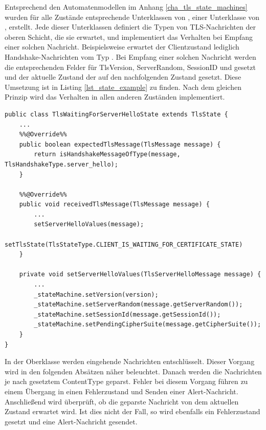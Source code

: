 Entsprechend den Automatenmodellen im Anhang \ref{cha_tls_state_machines} wurden für alle Zustände entsprechende Unterklassen von , einer Unterklasse von , erstellt. Jede dieser Unterklassen definiert die Typen von TLS-Nachrichten der oberen Schicht, die sie erwartet, und implementiert das Verhalten bei Empfang einer solchen Nachricht. Beispielsweise erwartet der Clientzustand  lediglich Handshake-Nachrichten vom Typ \serverhello{}. Bei Empfang einer solchen Nachricht werden die entsprechenden Felder für TlsVersion, ServerRandom, SessionID und \ciphersuite{} gesetzt und der aktuelle Zustand der  auf den nachfolgenden Zustand gesetzt. Diese Umsetzung ist in Listing \ref{lst_state_example} zu finden. Nach dem gleichen Prinzip wird das Verhalten in allen anderen Zuständen implementiert. 

\begin{lstlisting}
public class TlsWaitingForServerHelloState extends TlsState {
	...
	%%@Override%%
	public boolean expectedTlsMessage(TlsMessage message) {
		return isHandshakeMessageOfType(message, TlsHandshakeType.server_hello);
	}

	%%@Override%%
	public void receivedTlsMessage(TlsMessage message) {
		...
		setServerHelloValues(message);
		setTlsState(TlsStateType.CLIENT_IS_WAITING_FOR_CERTIFICATE_STATE)
	}

	private void setServerHelloValues(TlsServerHelloMessage message) {
		...
		_stateMachine.setVersion(version);
		_stateMachine.setServerRandom(message.getServerRandom());
		_stateMachine.setSessionId(message.getSessionId());
		_stateMachine.setPendingCipherSuite(message.getCipherSuite());
	}
}
\end{lstlisting}

In der Oberklasse  werden eingehende Nachrichten entschlüsselt. Dieser Vorgang wird in den folgenden Absätzen näher beleuchtet. Danach werden die Nachrichten je nach gesetztem ContentType geparst. Fehler bei diesem Vorgang führen zu einem Übergang in einen Fehlerzustand und Senden einer Alert-Nachricht. Anschließend wird überprüft, ob die geparste Nachricht von dem aktuellen Zustand erwartet wird. Ist dies nicht der Fall, so wird ebenfalls ein Fehlerzustand gesetzt und eine Alert-Nachricht gesendet.

